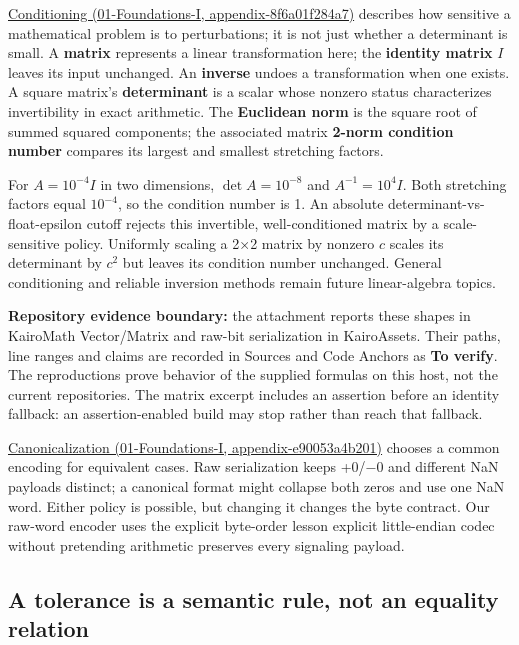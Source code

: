 \href{../01-Foundations-I/main.pdf\#nameddest=appendix-8f6a01f284a7}{Conditioning (01-Foundations-I, appendix-8f6a01f284a7)} describes how sensitive a mathematical problem is to perturbations; it is not just whether a determinant is small. A \textbf{matrix} represents a linear transformation here; the \textbf{identity matrix} \(I\) leaves its input unchanged. An \textbf{inverse} undoes a transformation when one exists. A square matrix's \textbf{determinant} is a scalar whose nonzero status characterizes invertibility in exact arithmetic. The \textbf{Euclidean norm} is the square root of summed squared components; the associated matrix \textbf{2-norm condition number} compares its largest and smallest stretching factors.

For \(A=10^{-4}I\) in two dimensions, \(\det A=10^{-8}\) and \(A^{-1}=10^4I\). Both stretching factors equal \(10^{-4}\), so the condition number is 1. An absolute determinant-vs-float-epsilon cutoff rejects this invertible, well-conditioned matrix by a scale-sensitive policy. Uniformly scaling a 2×2 matrix by nonzero \(c\) scales its determinant by \(c^2\) but leaves its condition number unchanged. General conditioning and reliable inversion methods remain future linear-algebra topics.

\textbf{Repository evidence boundary:} the attachment reports these shapes in KairoMath Vector/Matrix and raw-bit serialization in KairoAssets. Their paths, line ranges and claims are recorded in Sources and Code Anchors as \textbf{To verify}. The reproductions prove behavior of the supplied formulas on this host, not the current repositories. The matrix excerpt includes an assertion before an identity fallback: an assertion-enabled build may stop rather than reach that fallback.

\href{../01-Foundations-I/main.pdf\#nameddest=appendix-e90053a4b201}{Canonicalization (01-Foundations-I, appendix-e90053a4b201)} chooses a common encoding for equivalent cases. Raw serialization keeps +0/−0 and different NaN payloads distinct; a canonical format might collapse both zeros and use one NaN word. Either policy is possible, but changing it changes the byte contract. Our raw-word encoder uses the explicit byte-order lesson explicit little-endian codec without pretending arithmetic preserves every signaling payload.

\subsection{A tolerance is a semantic rule, not an equality relation}\label{05-engine-i-ch001-a-tolerance-is-a-semantic-rule-not-an-equality-relation}

